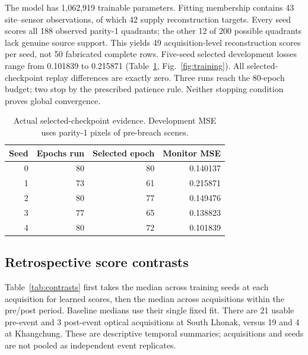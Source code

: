 \documentclass[10pt,twocolumn]{article}
\begin{document}
The model has 1,062,919 trainable parameters. Fitting membership contains 43 site--sensor observations, of which 42 supply reconstruction targets. Every seed scores all 188 observed parity-1 quadrants; the other 12 of 200 possible quadrants lack genuine source support. This yields 49 acquisition-level reconstruction scores per seed, not 50 fabricated complete rows. Five-seed selected development losses range from 0.101839 to 0.215871 (Table~\ref{tab:seeds}, Fig.~\ref{fig:training}). All selected-checkpoint replay differences are exactly zero. Three runs reach the 80-epoch budget; two stop by the prescribed patience rule. Neither stopping condition proves global convergence.

\begin{table}[t]\centering\small
\caption{Actual selected-checkpoint evidence. Development MSE uses parity-1 pixels of pre-breach scenes.}\label{tab:seeds}
\begin{tabular}{rrrr}\toprule
Seed & Epochs run & Selected epoch & Monitor MSE\\\midrule
0 & 80 & 80 & 0.140137\\
1 & 73 & 61 & 0.215871\\
2 & 80 & 77 & 0.149476\\
3 & 77 & 65 & 0.138823\\
4 & 80 & 72 & 0.101839\\
\bottomrule\end{tabular}
\end{table}

\subsection{Retrospective score contrasts}
Table~\ref{tab:contrasts} first takes the median across training seeds at each acquisition for learned scores, then the median across acquisitions within the pre/post period. Baseline medians use their single fixed fit. There are 21 usable pre-event and 3 post-event optical acquisitions at South Lhonak, versus 19 and 4 at Khangchung. These are descriptive temporal summaries; acquisitions and seeds are not pooled as independent event replicates.
\end{document}
